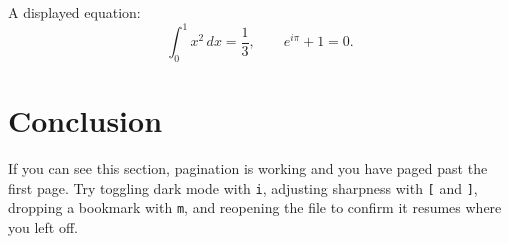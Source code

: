 \documentclass[11pt]{article}
\begin{document}
A displayed equation:
\begin{equation}
    \int_0^1 x^2 \, dx = \frac{1}{3},
    \qquad
    e^{i\pi} + 1 = 0.
\end{equation}

\section{Conclusion}
If you can see this section, pagination is working and you have paged past the
first page. Try toggling dark mode with \texttt{i}, adjusting sharpness with
\texttt{[} and \texttt{]}, dropping a bookmark with \texttt{m}, and reopening the
file to confirm it resumes where you left off.
\end{document}
